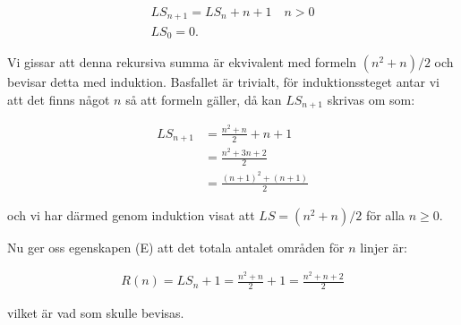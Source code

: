 \documentclass{article}
\begin{document}
\begin{gather*}
  LS_{n + 1} = LS_{n} + n + 1 \quad n > 0 \\
  LS_{0} = 0\text{.}
\end{gather*}

Vi gissar att denna rekursiva summa är ekvivalent med formeln $(n ^2 + n) / 2$ och bevisar detta med induktion. Basfallet är trivialt, för induktionssteget antar vi att det finns något $n$ så att formeln gäller, då kan $LS_{n + 1}$ skrivas om som:

\begin{align*}
  LS_{n + 1} &= \frac{n^{2} + n}{2} + n + 1 \\
             &= \frac{n^{2} + 3n + 2}{2} \\
  &= \frac{(n + 1)^{2} + (n + 1)}{2}
\end{align*}

och vi har därmed genom induktion visat att $LS = (n^{2} + n) / 2$ för alla $n \geq 0$.

Nu ger oss egenskapen (E) att det totala antalet områden för $n$ linjer är:

\begin{gather*}
  R(n) = LS_{n} + 1 = \frac{n^{2} + n}{2} + 1 = \frac{n^{2} + n + 2}{2}
\end{gather*}

vilket är vad som skulle bevisas.

\centering{$\qed$}
\end{document}
